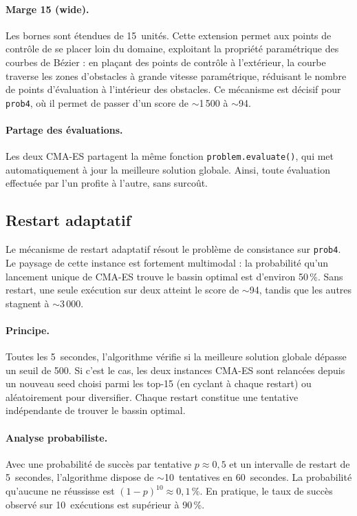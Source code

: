 \paragraph{Marge 15 (wide).}
Les bornes sont étendues de 15~unités.  Cette extension permet aux points de
contrôle de se placer loin du domaine, exploitant la propriété paramétrique des
courbes de Bézier : en plaçant des points de contrôle à l'extérieur, la courbe
traverse les zones d'obstacles à grande vitesse paramétrique, réduisant le
nombre de points d'évaluation à l'intérieur des obstacles.  Ce mécanisme est
décisif pour \texttt{prob4}, où il permet de passer d'un score de $\sim$1\,500
à $\sim$94.

\paragraph{Partage des évaluations.}
Les deux CMA-ES partagent la même fonction \texttt{problem.evaluate()}, qui met
automatiquement à jour la meilleure solution globale.  Ainsi, toute évaluation
effectuée par l'un profite à l'autre, sans surcoût.

\subsection{Restart adaptatif}

Le mécanisme de restart adaptatif résout le problème de consistance sur
\texttt{prob4}.  Le paysage de cette instance est fortement multimodal : la
probabilité qu'un lancement unique de CMA-ES trouve le bassin optimal est
d'environ 50\,\%.  Sans restart, une seule exécution sur deux atteint le score
de $\sim$94, tandis que les autres stagnent à $\sim$3\,000.

\paragraph{Principe.}
Toutes les 5~secondes, l'algorithme vérifie si la meilleure solution globale
dépasse un seuil de 500.  Si c'est le cas, les deux instances CMA-ES sont
relancées depuis un nouveau seed choisi parmi les top-15 (en cyclant à chaque
restart) ou aléatoirement pour diversifier.  Chaque restart constitue une
tentative indépendante de trouver le bassin optimal.

\paragraph{Analyse probabiliste.}
Avec une probabilité de succès par tentative $p \approx 0{,}5$ et un intervalle
de restart de 5~secondes, l'algorithme dispose de $\sim$10~tentatives en
60~secondes.  La probabilité qu'aucune ne réussisse est
$(1-p)^{10} \approx 0{,}1\,\%$.  En pratique, le taux de succès observé sur
10~exécutions est supérieur à 90\,\%.

